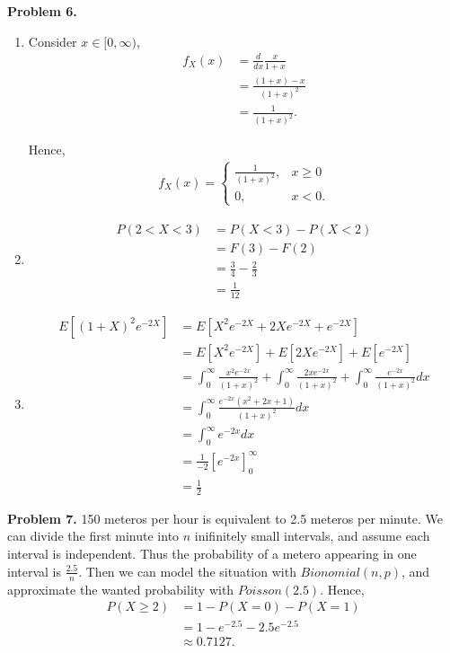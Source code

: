 \documentclass{article}
\begin{document}
\textbf{Problem 6.}
\begin{enumerate}[label={(\alph*)}]
    \item 
    Consider $x \in [0,\infty)$,
    \begin{align}
        f_X(x) & = \frac{d}{dx}\frac{x}{1+x} \\
        & = \frac{(1+x)-x}{(1+x)^2} \\
        & = \frac{1}{(1+x)^2}.
    \end{align}

    Hence, 
    \begin{align}
        f_X(x) = 
        \begin{cases}
            \frac{1}{(1+x)^2}, & x \ge 0 \\
            0, & x < 0  .
        \end{cases}
    \end{align}

    \item 
    \begin{align}
        P(2<X<3) & = P(X<3)-P(X<2) \\
        & = F(3) - F(2) \\
        & = \frac{3}{4} - \frac{2}{3} \\ 
        & = \frac{1}{12}
    \end{align}

    \item 
    \begin{align}
        E\left[(1+X)^2e^{-2X}\right] & = E\left[X^2e^{-2X}+2Xe^{-2X}+e^{-2X}\right] \\
        & = E\left[X^2e^{-2X}\right] + E\left[2Xe^{-2X}\right] + E\left[e^{-2X}\right] \\
        & = \int_{0}^{\infty}\frac{x^2e^{-2x}}{(1+x)^2}+\int_{0}^{\infty}\frac{2xe^{-2x}}{(1+x)^2}+\int_{0}^{\infty}\frac{e^{-2x}}{(1+x)^2}dx \\ 
        & = \int_{0}^{\infty}\frac{e^{-2x}(x^2+2x+1)}{(1+x)^2}dx \\
        & = \int_{0}^{\infty}e^{-2x}dx \\
        & = \frac{1}{-2}\left[e^{-2x}\right]_0^{\infty} \\
        & = \frac{1}{2}
    \end{align}
\end{enumerate}
\pagebreak

\textbf{Problem 7.}
150 meteros per hour is equivalent to 2.5 meteros per minute. 
We can divide the first minute into $n$ inifinitely small intervals, and assume each interval is independent. 
Thus the probability of a metero appearing in one interval is $\frac{2.5}{n}$. 
Then we can model the situation with $Bionomial(n,p)$, and approximate the wanted probability with $Poisson(2.5)$.
Hence,
\begin{align}
    P(X \ge 2) & = 1 - P(X=0) - P(X=1) \\
    & = 1 - e^{-2.5} - 2.5e^{-2.5} \\
    & \approx 0.7127.
\end{align}
\bigbreak
\end{document}
